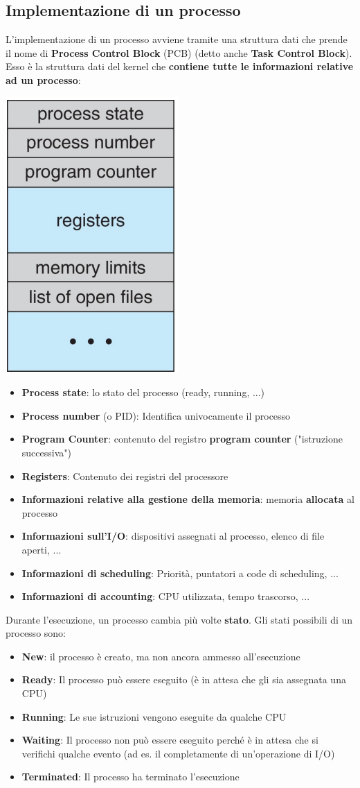 \documentclass[12pt]{article}
\begin{document}
\subsection{Implementazione di un processo}
L'implementazione di un processo avviene tramite una struttura dati che prende il nome di \textbf{Process Control Block} (PCB) (detto anche \textbf{Task Control Block}).
Esso è la struttura dati del kernel che \textbf{contiene tutte le informazioni relative ad un processo}:
\begin{center}
    \includegraphics[width = 0.23\linewidth]{Images/38.png}
\end{center}
\begin{itemize}
    \item \textbf{Process state}: lo stato del processo (ready, running, ...)
    \item \textbf{Process number} (o PID): Identifica univocamente il processo
    \item \textbf{Program Counter}: contenuto del registro \textbf{program counter} ("istruzione successiva")
    \item \textbf{Registers}: Contenuto dei registri del processore
    \item \textbf{Informazioni relative alla gestione della memoria}: memoria \textbf{allocata} al processo
    \item \textbf{Informazioni sull'I/O}: dispositivi assegnati al processo, elenco di file aperti, ... 
    \item \textbf{Informazioni di scheduling}: Priorità, puntatori a code di scheduling, ... 
    \item \textbf{Informazioni di accounting}: CPU utilizzata, tempo trascorso, ... 
\end{itemize}
Durante l'esecuzione, un processo cambia più volte \textbf{stato}. Gli stati possibili di un processo sono:
\begin{itemize}
    \item \textbf{New}: il processo è creato, ma non ancora ammesso all'esecuzione
    \item \textbf{Ready}: Il processo può essere eseguito (è in attesa che gli sia assegnata una CPU)
    \item \textbf{Running}: Le sue istruzioni vengono eseguite da qualche CPU
    \item \textbf{Waiting}: Il processo non può essere eseguito perché è in attesa che si verifichi qualche evento (ad es. il completamente di un'operazione di I/O)
    \item \textbf{Terminated}: Il processo ha terminato l'esecuzione
\end{itemize}
\end{document}
